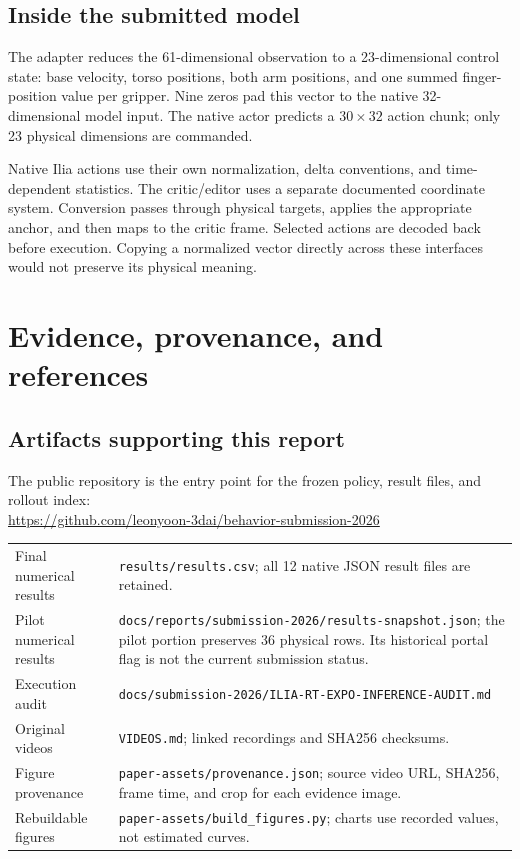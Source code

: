 \documentclass[11pt]{article}
\newcommand{\docpath}[1]{{\small\nolinkurl{#1}}}
\begin{document}
\subsection{Inside the submitted model}
The adapter reduces the 61-dimensional observation to a 23-dimensional control state: base velocity, torso positions, both arm positions, and one summed finger-position value per gripper. Nine zeros pad this vector to the native 32-dimensional model input. The native actor predicts a $30\!\times\!32$ action chunk; only 23 physical dimensions are commanded.

Native Ilia actions use their own normalization, delta conventions, and time-dependent statistics. The critic/editor uses a separate documented coordinate system. Conversion passes through physical targets, applies the appropriate anchor, and then maps to the critic frame. Selected actions are decoded back before execution. Copying a normalized vector directly across these interfaces would not preserve its physical meaning.

\newpage
\section{Evidence, provenance, and references}
\subsection{Artifacts supporting this report}
The public repository is the entry point for the frozen policy, result files, and rollout index:\\
\url{https://github.com/leonyoon-3dai/behavior-submission-2026}

\par\vspace{2pt}
\begin{tabularx}{\linewidth}{@{}p{.28\linewidth}X@{}}\toprule
Final numerical results & \docpath{results/results.csv}; all 12 native JSON result files are retained.\\
Pilot numerical results & \docpath{docs/reports/submission-2026/results-snapshot.json}; the pilot portion preserves 36 physical rows. Its historical portal flag is not the current submission status.\\
Execution audit & \docpath{docs/submission-2026/ILIA-RT-EXPO-INFERENCE-AUDIT.md}\\
Original videos & \docpath{VIDEOS.md}; linked recordings and SHA256 checksums.\\
Figure provenance & \docpath{paper-assets/provenance.json}; source video URL, SHA256, frame time, and crop for each evidence image.\\
Rebuildable figures & \docpath{paper-assets/build_figures.py}; charts use recorded values, not estimated curves.\\
\bottomrule\end{tabularx}\par\vspace{2pt}
\end{document}
